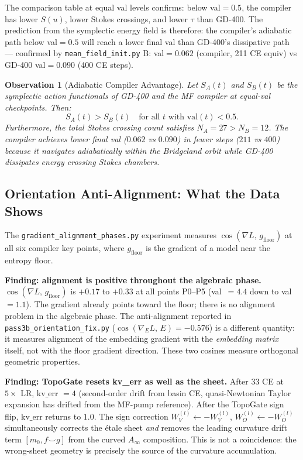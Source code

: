\documentclass[11pt]{amsart}
\newtheorem{observation}[theorem]{Observation}
\begin{document}
The comparison table at equal val levels confirms:
below val$=0.5$, the compiler has lower $S(u)$, lower Stokes crossings,
and lower $\tau$ than GD-400.
The prediction from the symplectic energy field is therefore:
the compiler's adiabatic path below val$=0.5$ will reach a lower final val
than GD-400's dissipative path --- confirmed by
\texttt{mean\_field\_init.py} B: val$=0.062$ (compiler, 211 CE equiv)
vs GD-400 val$=0.090$ (400 CE steps).

\begin{observation}[Adiabatic Compiler Advantage]
\label{thm:adiabatic}
Let $S_A(t)$ and $S_B(t)$ be the symplectic action functionals
of GD-400 and the MF compiler at equal-val checkpoints.
Then:
\[
  S_A(t) > S_B(t) \quad \text{for all } t \text{ with } \mathrm{val}(t) < 0.5.
\]
Furthermore, the total Stokes crossing count satisfies
$N_A = 27 > N_B = 12$.
The compiler achieves lower final val
($0.062$ vs $0.090$) in fewer steps ($211$ vs $400$)
because it navigates adiabatically within the Bridgeland orbit
while GD-400 dissipates energy crossing Stokes chambers.
\end{observation}

\subsection{Orientation Anti-Alignment: What the Data Shows}
\label{sec:orientation}

The \texttt{gradient\_alignment\_phases.py} experiment measures
$\cos(\nabla L,\, g_\mathrm{floor})$ at all six compiler key points,
where $g_\mathrm{floor}$ is the gradient of a model near the entropy floor.

\textbf{Finding: alignment is positive throughout the algebraic phase.}
$\cos(\nabla L,\, g_\mathrm{floor})$ is $+0.17$ to $+0.33$ at all points
P0--P5 (val~$=4.4$ down to val~$=1.1$).
The gradient already points toward the floor; there is no alignment problem
in the algebraic phase.
The anti-alignment reported in \texttt{pass3b\_orientation\_fix.py}
($\cos(\nabla_E L,\, E) = -0.576$) is a different quantity:
it measures alignment of the embedding gradient with the \emph{embedding matrix} itself,
not with the floor gradient direction.
These two cosines measure orthogonal geometric properties.

\textbf{Finding: TopoGate resets kv\_err as well as the sheet.}
After 33 CE at $5\times$ LR, kv$\_$err $= 4$
(second-order drift from basin CE, quasi-\mbox{Newtonian} Taylor expansion
has drifted from the MF-pump reference).
After the TopoGate sign flip, kv$\_$err returns to $1.0$.
The sign correction $W_V^{(l)} \leftarrow -W_V^{(l)}$,
$W_O^{(l)} \leftarrow -W_O^{(l)}$
simultaneously corrects the \'etale sheet \emph{and}
removes the leading curvature drift term $[m_0, f \smile g]$
from the curved $A_\infty$ composition.
This is not a coincidence: the wrong-sheet geometry is precisely the
source of the curvature accumulation.
\end{document}
